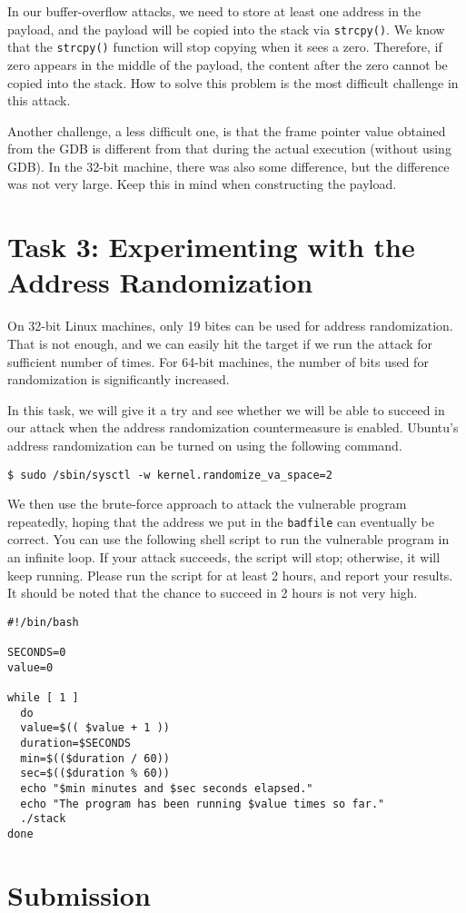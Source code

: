 In our buffer-overflow attacks, we need to store at least one address 
in the payload, and the payload will be copied into the stack via
\texttt{strcpy()}. We know that the \texttt{strcpy()} function
will stop copying when it sees a zero. Therefore, if zero 
appears in the middle of the payload, the content after the 
zero cannot be copied into the stack. How to solve this 
problem is the most difficult challenge in this attack. 


Another challenge, a less difficult one, is that the frame pointer value 
obtained from the GDB is different from that during the actual
execution (without using GDB). In the 32-bit machine, there 
was also some difference, but the difference was not very large. 
Keep this in mind when constructing the payload. 


\section{Task 3: Experimenting with the Address Randomization}

On 32-bit Linux machines, only 19 bites can be used for address randomization.
That is not enough, and we can easily hit the target 
if we run the attack for sufficient number of times. For 64-bit 
machines, the number of bits used for randomization is 
significantly increased. 

In this task, we will give it a try and see whether we will be 
able to succeed in our attack when the address randomization countermeasure 
is enabled. 
Ubuntu's address randomization can be turned on 
using the following command.  


\begin{lstlisting}
$ sudo /sbin/sysctl -w kernel.randomize_va_space=2
\end{lstlisting}


We then use the brute-force approach to attack the vulnerable program repeatedly, hoping that 
the address we put in the \texttt{badfile} can eventually be correct. You can 
use the following shell script to run the vulnerable program in an infinite loop. If your
attack succeeds, the script will stop; otherwise, it will keep running. 
Please run the script for at least 2 hours, and report your results. It should be 
noted that the chance to succeed in 2 hours is not very high.  


\begin{lstlisting}
#!/bin/bash

SECONDS=0
value=0

while [ 1 ]
  do
  value=$(( $value + 1 ))
  duration=$SECONDS
  min=$(($duration / 60))
  sec=$(($duration % 60))
  echo "$min minutes and $sec seconds elapsed."
  echo "The program has been running $value times so far."
  ./stack
done
\end{lstlisting}



\section{Submission}

\seedsubmission



